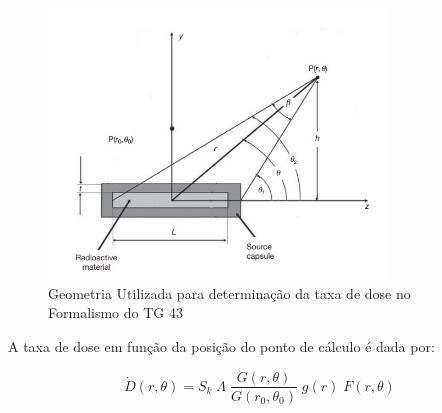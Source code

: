 \documentclass[11pt,a4paper]{article}
\begin{document}
				\begin{figure}[h]
					\centering
					\includegraphics[width=0.8\textwidth]{Imagens/esquemaFormalismoTg43.JPG}
					\caption{Geometria Utilizada para determinação da taxa de dose no Formalismo do TG 43}
					\label{img:FormalismoTg43}
				\end{figure}

			A taxa de dose em função da posição do ponto de cálculo é dada por:

			\begin{equation}
				\dot{D}(r, \theta) = S_k \; \varLambda \; \frac{G(r, \theta)}{G(r_0, \theta_0)} 
				\; g(r) \; F(r, \theta)
				\label{eq:formalismoTg43}
			\end{equation}
\end{document}
